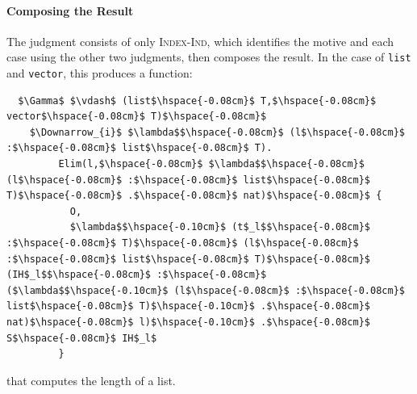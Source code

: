\paragraph{Composing the Result}
The  judgment consists of only \textsc{Index-Ind}, which 
identifies the motive and each case using the other two judgments, then composes the result. In the case of \lstinline{list} and \lstinline{vector},
this produces a function:
\begin{lstlisting}
  $\Gamma$ $\vdash$ (list$\hspace{-0.08cm}$ T,$\hspace{-0.08cm}$ vector$\hspace{-0.08cm}$ T)$\hspace{-0.08cm}$
    $\Downarrow_{i}$ $\lambda$$\hspace{-0.08cm}$ (l$\hspace{-0.08cm}$ :$\hspace{-0.08cm}$ list$\hspace{-0.08cm}$ T).
         Elim(l,$\hspace{-0.08cm}$ $\lambda$$\hspace{-0.08cm}$ (l$\hspace{-0.08cm}$ :$\hspace{-0.08cm}$ list$\hspace{-0.08cm}$ T)$\hspace{-0.08cm}$ .$\hspace{-0.08cm}$ nat)$\hspace{-0.08cm}$ {
           O, 
           $\lambda$$\hspace{-0.10cm}$ (t$_l$$\hspace{-0.08cm}$ :$\hspace{-0.08cm}$ T)$\hspace{-0.08cm}$ (l$\hspace{-0.08cm}$ :$\hspace{-0.08cm}$ list$\hspace{-0.08cm}$ T)$\hspace{-0.08cm}$ (IH$_l$$\hspace{-0.08cm}$ :$\hspace{-0.08cm}$ ($\lambda$$\hspace{-0.10cm}$ (l$\hspace{-0.08cm}$ :$\hspace{-0.08cm}$ list$\hspace{-0.08cm}$ T)$\hspace{-0.10cm}$ .$\hspace{-0.08cm}$ nat)$\hspace{-0.08cm}$ l)$\hspace{-0.10cm}$ .$\hspace{-0.08cm}$ S$\hspace{-0.08cm}$ IH$_l$
         }
\end{lstlisting}
that computes the length of a list.

